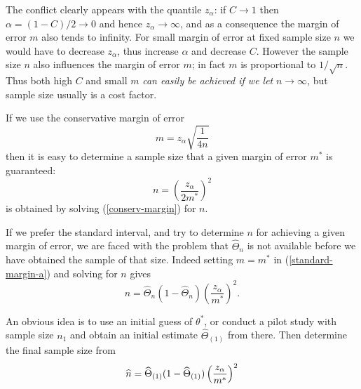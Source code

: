 The conflict clearly appears with the quantile $z_{\alpha}$: if $%
C\rightarrow 1$ then $\alpha =\left( 1-C\right) /2\rightarrow 0$ and hence $%
z_{\alpha}\rightarrow \infty $, and as a consequence the margin of
error $m$ also tends to infinity. For small margin of error at fixed sample
size $n$ we would have to decrease $z_{\alpha}$, thus increase $%
\alpha $ and decrease $C$. However the sample size $n$ also influences the
margin of error $m$; in fact $m$ is proportional to $1/\sqrt{n}$. Thus both
high $C$ and small $m$ \textit{can easily be achieved if we let }$%
n\rightarrow \infty $, but sample size usually is a cost factor.

If we use the conservative margin of error 
\begin{equation}
m=z_{\alpha}\sqrt{\frac{1}{4n}}  \label{conserv-margin}
\end{equation}%
then it is easy to determine a sample size that a given margin of error $%
m^{\ast }$ is guaranteed: 
\begin{equation}
n=\left( \frac{z_{\alpha}}{2m^{\ast }}\right) ^{2}
\label{sample-size-determin-1}
\end{equation}%
is obtained by solving (\ref{conserv-margin}) for $n$.

If we prefer the standard interval, and try to determine $n$ for achieving a
given margin of error, we are faced with the problem that $\widehat{\Theta}_{n}$ is
not available before we have obtained the sample of that size. Indeed
setting $m=m^{\ast }$ in (\ref{standard-margin-a}) and solving for $n$ gives 
\begin{equation*}
n=\widehat{\Theta}_{n}(1-\widehat{\Theta}_{n})\left( \frac{z_{\alpha}}{m^{\ast }}%
\right) ^{2}.
\end{equation*}

An obvious idea is to use an initial guess of $\theta^*$, or conduct a pilot study
with sample size $n_{1}$ and obtain an initial estimate $\widehat{\Theta}_{(1)}$ from
there. Then determine the final sample size from 
\begin{equation*}
\widehat{n}=\widehat{\Theta}_{(1)}(1-\widehat{\Theta}_{(1)})\left( \frac{z_{\alpha}}{%
m^{\ast }}\right) ^{2}
\end{equation*}

